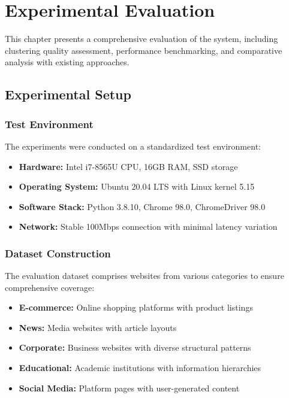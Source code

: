 \chapter{Experimental Evaluation}
\label{chap:evaluation}

This chapter presents a comprehensive evaluation of the {\name} system, including clustering quality assessment, performance benchmarking, and comparative analysis with existing approaches.

\section{Experimental Setup}
\label{sec:experimental_setup}

\subsection{Test Environment}

The experiments were conducted on a standardized test environment:

\begin{itemize}
\item \textbf{Hardware:} Intel i7-8565U CPU, 16GB RAM, SSD storage
\item \textbf{Operating System:} Ubuntu 20.04 LTS with Linux kernel 5.15
\item \textbf{Software Stack:} Python 3.8.10, Chrome 98.0, ChromeDriver 98.0
\item \textbf{Network:} Stable 100Mbps connection with minimal latency variation
\end{itemize}

\subsection{Dataset Construction}

The evaluation dataset comprises websites from various categories to ensure comprehensive coverage:

\begin{itemize}
\item \textbf{E-commerce:} Online shopping platforms with product listings
\item \textbf{News:} Media websites with article layouts
\item \textbf{Corporate:} Business websites with diverse structural patterns
\item \textbf{Educational:} Academic institutions with information hierarchies
\item \textbf{Social Media:} Platform pages with user-generated content
\end{itemize}

